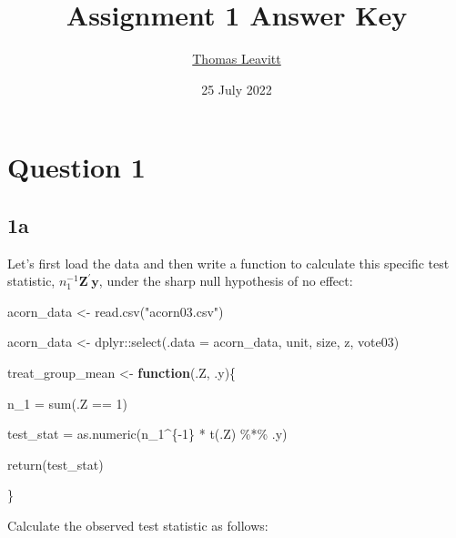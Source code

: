 \documentclass[
  12pt,
  leqno]{article}
\title{Assignment 1 Answer Key}
\author{\href{mailto:tl2624@columbia.edu}{Thomas Leavitt}}
\date{25 July 2022}
\newenvironment{Shaded}{\begin{snugshade}}{\end{snugshade}}
\newcommand{\AttributeTok}[1]{\textcolor[rgb]{0.77,0.63,0.00}{#1}}
\newcommand{\ControlFlowTok}[1]{\textcolor[rgb]{0.13,0.29,0.53}{\textbf{#1}}}
\newcommand{\DecValTok}[1]{\textcolor[rgb]{0.00,0.00,0.81}{#1}}
\newcommand{\FunctionTok}[1]{\textcolor[rgb]{0.00,0.00,0.00}{#1}}
\newcommand{\NormalTok}[1]{#1}
\newcommand{\OtherTok}[1]{\textcolor[rgb]{0.56,0.35,0.01}{#1}}
\newcommand{\SpecialCharTok}[1]{\textcolor[rgb]{0.00,0.00,0.00}{#1}}
\newcommand{\StringTok}[1]{\textcolor[rgb]{0.31,0.60,0.02}{#1}}
\DeclareMathOperator{\1}{\mathbbm{1}}
\begin{document}
\maketitle

\section*{Question 1}

\subsection*{1a}

Let's first load the data and then write a function to calculate this
specific test statistic, \(n_1^{-1}\mathbf{Z}^{\prime}\mathbf{y}\),
under the sharp null hypothesis of no effect:

\scriptsize

\begin{Shaded}
\begin{Highlighting}[]
\NormalTok{acorn\_data }\OtherTok{\textless{}{-}} \FunctionTok{read.csv}\NormalTok{(}\StringTok{"acorn03.csv"}\NormalTok{)}
  
\NormalTok{acorn\_data }\OtherTok{\textless{}{-}}\NormalTok{ dplyr}\SpecialCharTok{::}\FunctionTok{select}\NormalTok{(}\AttributeTok{.data =}\NormalTok{ acorn\_data, unit, size, z, vote03)}

\NormalTok{treat\_group\_mean }\OtherTok{\textless{}{-}} \ControlFlowTok{function}\NormalTok{(.Z,}
\NormalTok{                             .y)\{}
  
\NormalTok{  n\_1 }\OtherTok{=} \FunctionTok{sum}\NormalTok{(.Z }\SpecialCharTok{==} \DecValTok{1}\NormalTok{)}
  
\NormalTok{  test\_stat }\OtherTok{=} \FunctionTok{as.numeric}\NormalTok{(n\_1}\SpecialCharTok{\^{}}\NormalTok{\{}\SpecialCharTok{{-}}\DecValTok{1}\NormalTok{\} }\SpecialCharTok{*} \FunctionTok{t}\NormalTok{(.Z) }\SpecialCharTok{\%*\%}\NormalTok{ .y)}
  
  \FunctionTok{return}\NormalTok{(test\_stat)}
  
\NormalTok{  \}}
\end{Highlighting}
\end{Shaded}

\normalsize

Calculate the observed test statistic as follows: \scriptsize

\begin{Shaded}
\end{Shaded}
\end{document}
